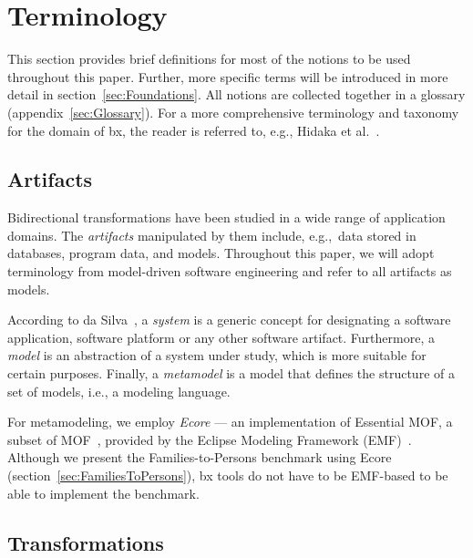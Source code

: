 \section{Terminology}
\label{sec:Terminology}

This section provides brief definitions for most of the notions to be used throughout this paper. 
Further, more specific terms will be introduced in more detail in section~\ref{sec:Foundations}. 
All notions are collected together in a glossary (appendix~\ref{sec:Glossary}). 
For a more comprehensive terminology and taxonomy for the domain of bx, the reader is referred to, e.g., Hidaka et al.~\cite{SOSYM-Hidaka2016}.

\subsection{Artifacts}
\label{sec:Artifacts}

Bidirectional transformations have been studied in a wide range of application domains. 
The \emph{artifacts} manipulated by them include, e.g.,\ data stored in databases, program data, and models. Throughout this paper, we will adopt terminology from model-driven software engineering and refer to all artifacts as models. 

According to da Silva~\cite{RodriguesdaSilva2015139}, a \emph{system} is a generic concept for designating a software application, software platform or any other software artifact. Furthermore, a \emph{model} is an abstraction of a system under study, which is more suitable for certain purposes. Finally, a \emph{metamodel} is a model that defines the structure of a set of models, i.e., a modeling language.

For metamodeling, we employ \emph{Ecore} --- an implementation of Essential MOF, a subset of MOF~\cite{MOF-2.5.1}, provided by the Eclipse Modeling Framework (EMF)~\cite{steinberg09}. 
Although we present the Families-to-Persons benchmark using Ecore (section~\ref{sec:FamiliesToPersons}), bx tools do not have to be EMF-based to be able to implement the benchmark.

\subsection{Transformations} 
\label{sec:Transformations}

